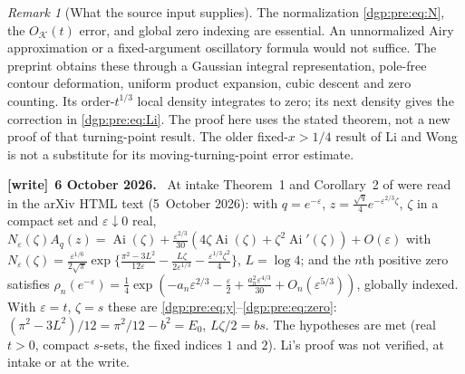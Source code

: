\documentclass[11pt,letterpaper]{article}
\numberwithin{equation}{section}
\theoremstyle{remark}\newtheorem{remark}[theorem]{Remark}
\newenvironment{writenote}[1][]{\par\smallskip\begingroup\small
 \noindent\textbf{[write]}\if\relax\detokenize{#1}\relax\else~\textbf{#1.}\fi\ }%
 {\par\endgroup\smallskip}
\begin{document}
\begin{remark}[What the source input supplies]
The normalization \eqref{dgp:pre:eq:N}, the $O_{\mathcal K}(t)$ error, and global
zero indexing are essential. An unnormalized Airy approximation or a
fixed-argument oscillatory formula would not suffice. The preprint
obtains these through a Gaussian integral representation, pole-free
contour deformation, uniform product expansion, cubic descent and
zero counting. Its order-$t^{1/3}$ local density integrates to zero;
its next density gives the correction in \eqref{dgp:pre:eq:Li}. The proof here
uses the stated theorem, not a new proof of that turning-point result.
The older fixed-$x>1/4$ result of Li and Wong~\cite{liwong} is not a
substitute for its moving-turning-point error estimate.
\end{remark}
\begin{writenote}[6 October 2026]
At intake Theorem~1 and Corollary~2 of \cite{li} were read in the arXiv HTML text (5~October 2026): with $q=e^{-\varepsilon}$, $z=\frac{\sqrt q}4e^{-\varepsilon^{2/3}\zeta}$, $\zeta$ in a compact set and $\varepsilon\downarrow0$ real, $N_\varepsilon(\zeta)A_q(z)=\operatorname{Ai}(\zeta)+\frac{\varepsilon^{2/3}}{30}(4\zeta\operatorname{Ai}(\zeta)+\zeta^2\operatorname{Ai}'(\zeta))+O(\varepsilon)$ with $N_\varepsilon(\zeta)=\frac{\varepsilon^{1/6}}{2\sqrt\pi}\exp\{\frac{\pi^2-3L^2}{12\varepsilon}-\frac{L\zeta}{2\varepsilon^{1/3}}-\frac{\varepsilon^{1/3}\zeta^2}4\}$, $L=\log4$; and the $n$th positive zero satisfies $\rho_n(e^{-\varepsilon})=\frac14\exp(-a_n\varepsilon^{2/3}-\frac\varepsilon2+\frac{a_n^2\varepsilon^{4/3}}{30}+O_n(\varepsilon^{5/3}))$, globally indexed. With $\varepsilon=t$, $\zeta=s$ these are \eqref{dgp:pre:eq:y}--\eqref{dgp:pre:eq:zero}: $(\pi^2-3L^2)/12=\pi^2/12-b^2=E_0$, $L\zeta/2=bs$. The hypotheses are met (real $t>0$, compact $s$-sets, the fixed indices $1$ and $2$). Li's proof was not verified, at intake or at the write.
\end{writenote}
\end{document}
